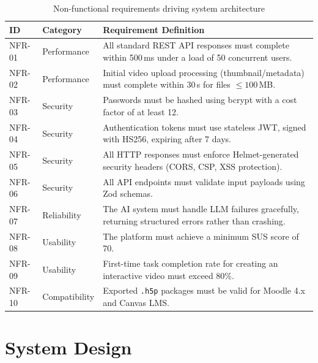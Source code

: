 \begin{table}[H]
  \centering
  \begin{tabularx}{\linewidth}{l >{\raggedright\arraybackslash}p{3.0cm} X}
    \toprule
    \textbf{ID} & \textbf{Category} & \textbf{Requirement Definition} \\
    \midrule
    NFR-01 & Performance & All standard REST API responses must complete within 500\,ms under a load of 50 concurrent users. \\
    \addlinespace
    NFR-02 & Performance & Initial video upload processing (thumbnail/metadata) must complete within 30\,s for files $\leq 100$\,MB. \\
    \addlinespace
    NFR-03 & Security    & Passwords must be hashed using bcrypt with a cost factor of at least 12. \\
    \addlinespace
    NFR-04 & Security    & Authentication tokens must use stateless JWT, signed with HS256, expiring after 7 days. \\
    \addlinespace
    NFR-05 & Security    & All HTTP responses must enforce Helmet-generated security headers (CORS, CSP, XSS protection). \\
    \addlinespace
    NFR-06 & Security    & All API endpoints must validate input payloads using Zod schemas. \\
    \addlinespace
    NFR-07 & Reliability & The AI system must handle LLM failures gracefully, returning structured errors rather than crashing. \\
    \addlinespace
    NFR-08 & Usability   & The platform must achieve a minimum SUS score of 70. \\
    \addlinespace
    NFR-09 & Usability   & First-time task completion rate for creating an interactive video must exceed 80\%. \\
    \addlinespace
    NFR-10 & Compatibility & Exported \texttt{.h5p} packages must be valid for Moodle 4.x and Canvas LMS. \\
    \bottomrule
  \end{tabularx}
  \small
  \caption{Non-functional requirements driving system architecture}
  \label{tab:nonfunc_reqs}
\end{table}

\section{System Design}
\label{sec:architecture}

